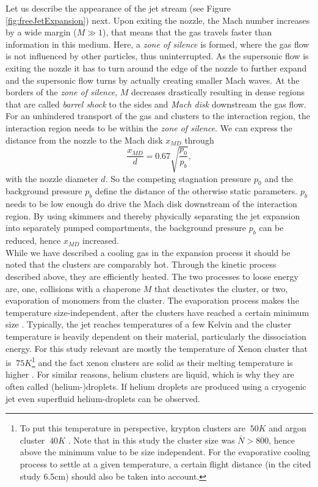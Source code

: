Let us describe the appearance of the jet stream (see Figure \ref{fig:freeJetExpansion}) next. Upon exiting the nozzle, the Mach number increases by a wide margin ($M\gg 1$), that means that the gas travels faster than information in this medium. Here, a \textit{zone of silence} is formed, where the gas flow is not influenced by other particles, thus uninterrupted. As the supersonic flow is exiting the nozzle it has to turn around the edge of the nozzle to further expand and the supersonic flow turns by actually creating smaller Mach waves. At the borders of the \textit{zone of silence}, $M$ decreases drastically resulting in dense regions that are called \textit{barrel shock} to the sides and \textit{Mach disk} downstream the gas flow. For an unhindered transport of the gas and clusters to the interaction region, the interaction region needs to be within the \textit{zone of silence}. We can express the distance from the nozzle to the Mach disk $x_{MD}$ through
\begin{equation}
\frac{x_{MD}}{d}=0.67\sqrt{\frac{p_{0}}{p_{b}}},
\label{eq:distance-of-mach-disk}
\end{equation}
with the nozzle diameter $d$. So the competing stagnation pressure $p_{0}$ and the background pressure $p_{b}$ define the distance of the otherwise static parameters. $p_{b}$ needs to be low enough do drive the Mach disk downstream of the interaction region. By using skimmers and thereby physically separating the jet expansion into separately pumped compartments, the background pressure $p_{b}$ can be reduced, hence $x_{MD}$ increased.\\
While we have described a cooling gas in the expansion process it should be noted that the clusters are comparably hot. Through the kinetic process described above, they are efficiently heated. The two processes to loose energy are, one, collisions with a chaperone $M$ that deactivates the cluster, or two, evaporation of monomers from the cluster. The evaporation process makes the temperature size-independent, after the clusters have reached a certain minimum size \cite{Farges-1981-SurfSci}. Typically, the jet reaches temperatures of a few Kelvin and the cluster temperature is heavily dependent on their material, particularly the dissociation energy. For this study relevant are mostly the temperature of Xenon cluster that is $~75K$\footnote{To put this temperature in perspective, krypton clusters are $~50K$ and argon cluster $~40K$ \citep{Farges-1981-SurfSci,Gspann-1986-Springer}. Note that in this study the cluster size was $\bar{N} > 800$, hence above the minimum value to be size independent. For the evaporative cooling process to settle at a given temperature, a certain flight distance (in the cited study 6.5cm) should also be taken into account.} and the fact xenon clusters are solid as their melting temperature is higher \cite{Gspann-1986-Springer}. For similar reasons, helium clusters are liquid, which is why they are often called (helium-)droplets. If helium droplets are produced using a cryogenic jet even superfluid helium-droplets can be observed.\\
